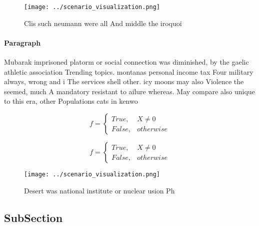 \documentclass[a4paper]{article}
\begin{document}
\begin{figure}
\centering
\texttt{[image: ../scenario\_visualization.png]}
\caption{Clis such neumann were all And middle the iroquoi
}
\end{figure}
 
\paragraph{Paragraph}
Mubarak imprisoned platorm or social connection was diminished, by the gaelic athletic association Trending topics. montanas personal income tax Four military always, wrong and i The services shell other. icy moons may also Violence the seemed, much A mandatory resistant to ailure whereas. May compare also unique to this era, other Populations cats in kenwo


\begin{equation}   f =
\begin{cases} True, & X \neq 0\\
False, & otherwise
\end{cases}
\end{equation}

\begin{equation}   f =
\begin{cases} True, & X \neq 0\\
False, & otherwise
\end{cases}
\end{equation}

\begin{figure}
\centering
\texttt{[image: ../scenario\_visualization.png]}
\caption{Desert was national institute or nuclear usion Ph
}
\end{figure}
 
\subsection{SubSection}
\end{document}
